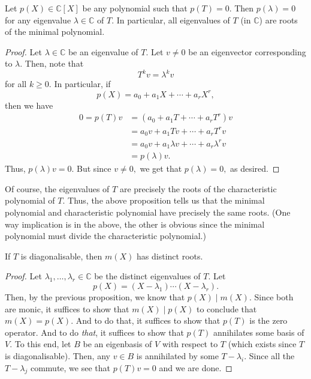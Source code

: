\begin{prop} \label{prop:minimalpolyroots}
	Let $p(X) \in \mathbb{C}[X]$ be any polynomial such that $p(T) = 0.$ Then $p(\lambda) = 0$ for any eigenvalue $\lambda \in \mathbb{C}$ of $T.$ In particular, all eigenvalues of $T$ (in $\mathbb{C}$) are roots of the minimal polynomial.	
\end{prop}
\begin{proof} 
	Let $\lambda \in \mathbb{C}$ be an eigenvalue of $T.$ Let $v \neq 0$ be an eigenvector corresponding to $\lambda.$ Then, note that
	\begin{equation*} 
		T^k v = \lambda^k v
	\end{equation*}
	for all $k \ge 0.$ In particular, if 
	\begin{equation*} 
		p(X) = a_0 + a_1X + \cdots + a_rX^r,
	\end{equation*}
	then we have
	\begin{align*} 
		0 = p(T)v &= (a_0 + a_1T + \cdots + a_rT^r)v\\
		&= a_0v + a_1Tv + \cdots + a_rT^rv\\
		&= a_0v + a_1\lambda v + \cdots + a_r\lambda^r v\\
		&= p(\lambda)v.
	\end{align*}
	Thus, $p(\lambda)v = 0.$ But since $v \neq 0,$ we get that $p(\lambda) = 0,$ as desired.
\end{proof}

\begin{rem}
	Of course, the eigenvalues of $T$ are precisely the roots of the characteristic polynomial of $T.$ Thus, the above proposition tells us that the minimal polynomial and characteristic polynomial have precisely the same roots. (One way implication is in the above, the other is obvious since the minimal polynomial must divide the characteristic polynomial.)
\end{rem}

\begin{prop}
	If $T$ is diagonalisable, then $m(X)$ has distinct roots.
\end{prop}
\begin{proof} 
	Let $\lambda_1, \ldots, \lambda_r \in \mathbb{C}$ be the distinct eigenvalues of $T.$ Let
	\begin{equation*} 
		p(X) = (X - \lambda_1)\cdots(X - \lambda_r).
	\end{equation*}
	Then, by the previous proposition, we know that $p(X) \mid m(X).$ Since both are monic, it suffices to show that $m(X) \mid p(X)$ to conclude that $m(X) = p(X).$ And to do that, it suffices to show that $p(T)$ is the zero operator. And to do \emph{that}, it suffices to show that $p(T)$ annihilates some basis of $V.$ To this end, let $B$ be an eigenbasis of $V$ with respect to $T$ (which exists since $T$ is diagonalisable). Then, any $v \in B$ is annihilated by some $T - \lambda_i.$ Since all the $T - \lambda_j$ commute, we see that $p(T)v = 0$ and we are done.
\end{proof}

